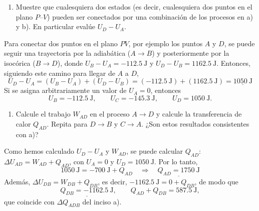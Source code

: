 \begin{ejemplo}
  \begin{enumerate}[label=\alph*),itemsep=2pt,resume]
    \item Muestre que cualesquiera dos estados (es decir, cualesquiera dos puntos en el plano
      $P$--$V$) pueden ser conectados por una combinación de los procesos en a) y b). En particular
      evalúe $U_D-U_A$.
  \end{enumerate}

  \begin{solucion}
    Para conectar dos puntos en el plano $PV$, por ejemplo los puntos $A$ y $D$, se puede seguir una
    trayectoria por la adiabática ($A\to B$) y posteriormente por la isocórica ($B\to D$), donde
    $U_B-U_A=-112.5\ \mathrm{J}$ y $U_D-U_B=1162.5\ \mathrm{J}$. Entonces, siguiendo este camino
    para llegar de $A$ a $D$,
    \begin{equation*}
      U_D-U_A=(U_B-U_A)+(U_D-U_B)=(-112.5\ \mathrm{J})+(1162.5\ \mathrm{J})=\underline{1050\ \mathrm{J}}
    \end{equation*}
    Si se asigna arbitrariamente un valor de $U_A=0$, entonces
    \begin{equation*}
      U_B=-112.5\ \mathrm{J},\qquad U_C=-145.3\ \mathrm{J},\qquad U_D=1050\ \mathrm{J}.
    \end{equation*}
  \end{solucion}

  \begin{enumerate}[label=\alph*),itemsep=2pt,resume]
    \item Calcule el trabajo $W_{AD}$ en el proceso $A\to D$ y calcule la transferencia de calor
      $Q_{AD}$. Repita para $D\to B$ y $C\to A$. ¿Son estos resultados consistentes con a)?
  \end{enumerate}

  \begin{solucion}
    Como hemos calculado $U_D-U_A$ y $W_{AD}$, se puede calcular $Q_{AD}$:
    $\Delta U_{AD}=W_{AD}+Q_{AD}$, con $U_A=0$ y $U_D=1050\ \mathrm{J}$. Por lo tanto,
    \begin{equation*}
      1050\ \mathrm{J}=-700\ \mathrm{J}+Q_{AD}\quad\Longrightarrow\quad\underline{Q_{AD}=1750\ \mathrm{J}}
    \end{equation*}
    Además, $\Delta U_{DB}=W_{DB}+Q_{DB}$, es decir, $-1162.5\ \mathrm{J}=0+Q_{DB}$, de modo que
    \begin{equation*}
      \underline{Q_{DB}=-1162.5\ \mathrm{J}},\qquad
      Q_{AD}+Q_{DB}=587.5\ \mathrm{J},
    \end{equation*}
    que coincide con $\Delta Q_{ADB}$ del inciso a).
  \end{solucion}
\end{ejemplo}

